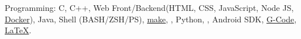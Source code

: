 \inlineheadsection
  {Programming:}
  {C,
   C++,
   Web Front/Backend(HTML, CSS, JavaScript, Node JS, \href{https://www.docker.com/}{Docker}),
   Java,
   Shell (BASH/ZSH/PS),
   \href{https://www.gnu.org/software/make/}{make},
   ,
   Python,
   ,
   Android SDK,
   \href{http://en.wikipedia.org/wiki/G-code}{G-Code},
   \href{http://www.latex-project.org}{\LaTeX}.
  }
    \vspace{0.3em}